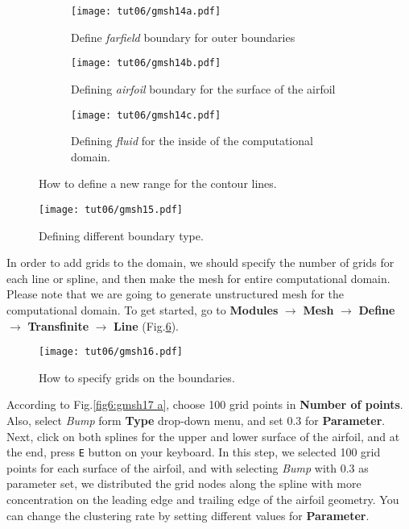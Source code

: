 \begin{figure}[htbp]
    \centering
     \begin{subfigure}[b]{.4\textwidth}
         \centering
         \texttt{[image: tut06/gmsh14a.pdf]}
         \caption{Define \textit{farfield} boundary for outer boundaries}
         \label{fig6:gmsh14 a}
     \end{subfigure}
     \hfill
     \begin{subfigure}[b]{.4\textwidth}
         \centering
         \texttt{[image: tut06/gmsh14b.pdf]}
         \caption{Defining \textit{airfoil} boundary for the surface of the airfoil}
         \label{fig6:gmsh14 b}
     \end{subfigure}  
     \hfill
     \begin{subfigure}[b]{.4\textwidth}
         \centering
         \texttt{[image: tut06/gmsh14c.pdf]}
         \caption{Defining \textit{fluid} for the inside of the computational domain.}
         \label{fig6:gmsh14 c}
     \end{subfigure} 
    \caption{How to define a new range for the contour lines.}
    \label{fig6:gmsh14}
\end{figure}
\begin{figure}[htbp]
    \centering
    \texttt{[image: tut06/gmsh15.pdf]}
    \caption{Defining different boundary type.}
    \label{fig6:gmsh15}
\end{figure}
In order to add grids to the domain, we should specify the number of grids for each line or spline, and then make the mesh for entire computational domain. Please note that we are going to generate unstructured mesh for the computational domain. To get started, go to \textbf{Modules} $\rightarrow$ \textbf{Mesh} $\rightarrow$ \textbf{Define} $\rightarrow$ \textbf{Transfinite} $\rightarrow$ \textbf{Line} (Fig.\ref{fig6:gmsh16}).
\begin{figure}[htbp]
    \centering
    \texttt{[image: tut06/gmsh16.pdf]}
    \caption{How to specify grids on the boundaries.}
    \label{fig6:gmsh16}
\end{figure}
According to Fig.\ref{fig6:gmsh17 a}, choose 100 grid points in \textbf{Number of points}. Also, select \textit{Bump} form \textbf{Type} drop-down menu, and set 0.3 for \textbf{Parameter}. Next, click on both splines for the upper and lower surface of the airfoil, and at the end, press \texttt{E} button on your keyboard. In this step, we selected 100 grid points for each surface of the airfoil, and with selecting \textit{Bump} with 0.3 as parameter set, we distributed the grid nodes along the spline with more concentration on the leading edge and trailing edge of the airfoil geometry. You can change the clustering rate by setting different values for \textbf{Parameter}.
